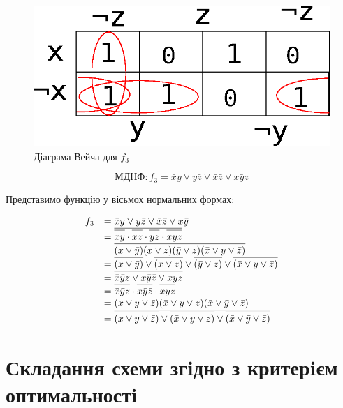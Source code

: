 \documentclass{labs}
\begin{document}
    \begin{figure}[ht]
      \centering
      \includegraphics{veich.eps}
      \caption{Діаграма Вейча для $f_3$}
      \label{veich-f3}
    \end{figure}

    $$\text{МДНФ}: f_3 = \bar{x}y \lor y\bar{z} \lor \bar{x}\bar{z} \lor x\bar{y}z$$

    Представимо функцію у вісьмох нормальних формах:

    $$
    \begin{array}{rl}
      f_3 &= \bar{x}y \lor y\bar{z} \lor \bar{x}\bar{z} \lor x\bar{y}\\
          &= \overline{\strut\overline{\strut\bar{x}y} \cdot \overline{\strut\bar{x}\bar{z}} \cdot \overline{\strut y\bar{z}} \cdot \overline{\strut x\bar{y}z}}\\
          &= \overline{\strut(x\lor\bar{y})(x\lor z)(\bar{y}\lor z)(\bar{x}\lor y\lor\bar{z})}\\
          &= \overline{\strut(x\lor\bar{y})} \lor \overline{\strut(x\lor z)} \lor \overline{\strut(\bar{y}\lor z)} \lor \overline{\strut(\bar{x}\lor y\lor\bar{z})}\\
          &= \overline{\strut \bar{x}\bar{y}z \lor x\bar{y}\bar{z} \lor xyz}\\
          &= \overline{\strut\bar{x}\bar{y}z} \cdot \overline{\strut x\bar{y}\bar{z}} \cdot \overline{\strut xyz}\\
          &= (x \lor y \lor \bar{z})(\bar{x} \lor y \lor z)(\bar{x} \lor \bar{y} \lor \bar{z})\\
          &= \overline{\strut\overline{\strut(x \lor y \lor \bar{z})} \lor \overline{\strut(\bar{x} \lor y \lor z)} \lor \overline{\strut(\bar{x} \lor \bar{y} \lor \bar{z})}}\\
    \end{array}
    $$

  \newpage
  \section{Складання схеми згiдно з критерiєм оптимальності}
\end{document}
